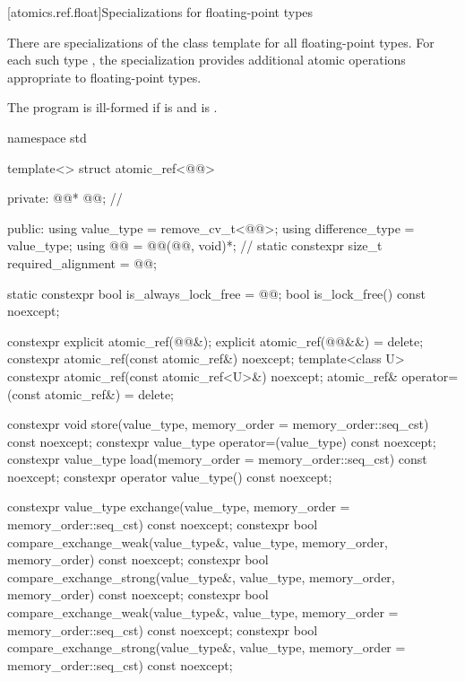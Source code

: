 [atomics.ref.float]{Specializations for floating-point types}

\pnum
{}%
There are specializations of the  class template
for all floating-point types.
For each such type ,
the specialization  provides
additional atomic operations appropriate to floating-point types.

\pnum
The program is ill-formed
if  is  and
 is .

\begin{codeblock}
namespace std {
  template<> struct atomic_ref<@@> {
  private:
    @@* @@;   // \expos

  public:
    using value_type = remove_cv_t<@@>;
    using difference_type = value_type;
    using @@ = @@(@@, void)*;       // \expos
    static constexpr size_t required_alignment = @@;

    static constexpr bool is_always_lock_free = @@;
    bool is_lock_free() const noexcept;

    constexpr explicit atomic_ref(@@&);
    explicit atomic_ref(@@&&) = delete;
    constexpr atomic_ref(const atomic_ref&) noexcept;
    template<class U>
      constexpr atomic_ref(const atomic_ref<U>&) noexcept;
    atomic_ref& operator=(const atomic_ref&) = delete;

    constexpr void store(value_type,
                         memory_order = memory_order::seq_cst) const noexcept;
    constexpr value_type operator=(value_type) const noexcept;
    constexpr value_type load(memory_order = memory_order::seq_cst) const noexcept;
    constexpr operator value_type() const noexcept;

    constexpr value_type exchange(value_type,
                                  memory_order = memory_order::seq_cst) const noexcept;
    constexpr bool compare_exchange_weak(value_type&, value_type,
                                         memory_order, memory_order) const noexcept;
    constexpr bool compare_exchange_strong(value_type&, value_type,
                                           memory_order, memory_order) const noexcept;
    constexpr bool compare_exchange_weak(value_type&, value_type,
                                         memory_order = memory_order::seq_cst) const noexcept;
    constexpr bool compare_exchange_strong(value_type&, value_type,
                                           memory_order = memory_order::seq_cst) const noexcept;

}}
\end{codeblock}
